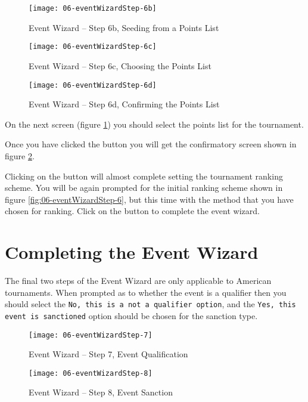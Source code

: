 \documentclass[a4paper,11pt]{memoir}
\begin{document}
\begin{figure}[!ht]
 \centering
 \begin{minipage}{0.4\textwidth}
  \centering
  \texttt{[image: 06-eventWizardStep-6b]}
  \caption{Event Wizard -- Step 6b, Seeding from a Points List} \label{fig:06-eventWizardStep-6b}
 \end{minipage}
 \hfill
 \begin{minipage}{0.4\textwidth}
  \centering
  \texttt{[image: 06-eventWizardStep-6c]}
  \caption{Event Wizard -- Step 6c, Choosing the Points List} \label{fig:06-eventWizardStep-6c}
 \end{minipage}
\end{figure}

\begin{figure}[!ht]
 \centering
 \texttt{[image: 06-eventWizardStep-6d]}
 \caption{Event Wizard -- Step 6d, Confirming the Points List} \label{fig:06-eventWizardStep-6d}
\end{figure}

On the next screen (figure \ref{fig:06-eventWizardStep-6c}) you should select the points list for the tournament.

Once you have clicked the  button you will get the confirmatory screen shown in figure \ref{fig:06-eventWizardStep-6d}.

Clicking on the  button will almost complete setting the tournament ranking scheme. You will be again prompted for the initial ranking scheme shown in figure \ref{fig:06-eventWizardStep-6}, but this time with the method that you have chosen for ranking. Click on the  button to complete the event wizard.

\section{Completing the Event Wizard}

The final two steps of the Event Wizard are only applicable to American tournaments. When prompted as to whether the event is a qualifier then you should select the \texttt{No, this is a not a qualifier option}, and the \texttt{Yes, this event is sanctioned} option should be chosen for the sanction type.

\begin{figure}[!ht]
 \centering
 \begin{minipage}{0.4\textwidth}
  \centering
  \texttt{[image: 06-eventWizardStep-7]}
  \caption{Event Wizard -- Step 7, Event Qualification} \label{fig:06-eventWizardStep-7}
 \end{minipage}
 \hfill
 \begin{minipage}{0.4\textwidth}
  \centering
  \texttt{[image: 06-eventWizardStep-8]}
  \caption{Event Wizard -- Step 8, Event Sanction} \label{fig:06-eventWizardStep-8}
 \end{minipage}
\end{figure}
\end{document}
